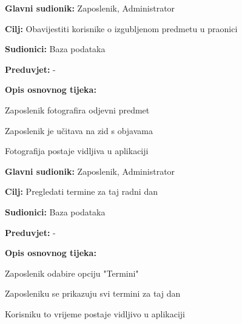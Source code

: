 \noindent {}
\begin{packed_item}
	
	\item \textbf{Glavni sudionik: }Zaposlenik, Administrator
	\item  \textbf{Cilj:} Obavijestiti korisnike o izgubljenom predmetu u praonici
	\item  \textbf{Sudionici:} Baza podataka
	\item  \textbf{Preduvjet:} -
	\item  \textbf{Opis osnovnog tijeka:}
	
	\item[] \begin{packed_enum}
		
		\item Zaposlenik fotografira odjevni predmet
		\item Zaposlenik je učitava na zid s objavama
		\item Fotografija postaje vidljiva u aplikaciji 
		
	\end{packed_enum}
	
	
\end{packed_item}
\noindent {}
\begin{packed_item}
	
	\item \textbf{Glavni sudionik: }Zaposlenik, Administrator
	\item  \textbf{Cilj:} Pregledati termine za taj radni dan
	\item  \textbf{Sudionici:} Baza podataka
	\item  \textbf{Preduvjet:} -
	\item  \textbf{Opis osnovnog tijeka:}
	
	\item[] \begin{packed_enum}
		
		\item Zaposlenik odabire opciju "Termini"
		\item Zaposleniku se prikazuju svi termini za taj dan
		\item Korisniku to vrijeme postaje vidljivo u aplikaciji
		
	\end{packed_enum}
\end{packed_item}
\noindent {}
